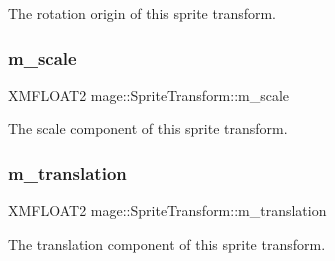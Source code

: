 The rotation origin of this sprite transform. \hypertarget{structmage_1_1_sprite_transform_a7532d4d41d02b5fa6f31eeb4fd4fd886}{}\label{structmage_1_1_sprite_transform_a7532d4d41d02b5fa6f31eeb4fd4fd886} 
\subsubsection{\texorpdfstring{m\+\_\+scale}{m\_scale}}
{\footnotesize\ttfamily X\+M\+F\+L\+O\+A\+T2 mage\+::\+Sprite\+Transform\+::m\+\_\+scale\hspace{0.3cm}{\ttfamily [private]}}

The scale component of this sprite transform. \hypertarget{structmage_1_1_sprite_transform_a7642907ec8ae9685bb7c56675607045b}{}\label{structmage_1_1_sprite_transform_a7642907ec8ae9685bb7c56675607045b} 
\subsubsection{\texorpdfstring{m\+\_\+translation}{m\_translation}}
{\footnotesize\ttfamily X\+M\+F\+L\+O\+A\+T2 mage\+::\+Sprite\+Transform\+::m\+\_\+translation\hspace{0.3cm}{\ttfamily [private]}}

The translation component of this sprite transform. 